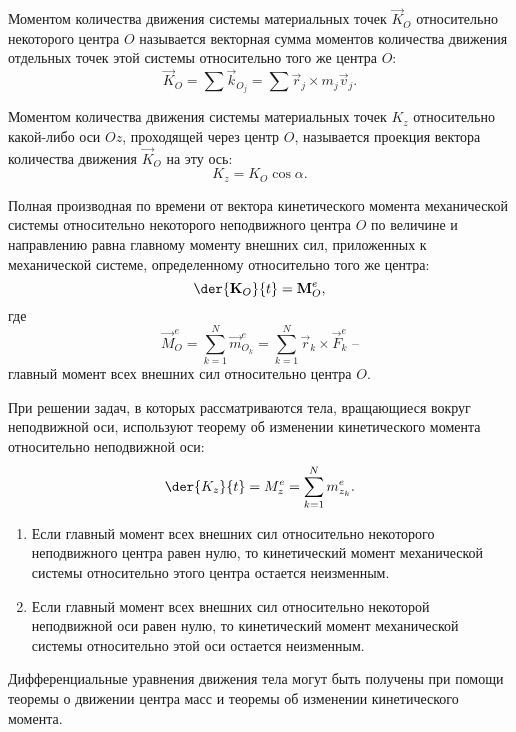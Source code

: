 
Моментом количества движения системы материальных точек \( \vec{K}_O \)
относительно некоторого центра \( O \) называется векторная сумма моментов
количества движения отдельных точек этой системы относительно того же центра
\( O \):
\[
    \vec{K}_O = \sum \vec{k}_{O_j} = \sum \vec{r}_j\times m_j\vec{v}_j.
\]
 
Моментом количества движения системы материальных точек \( K_z \) относительно
какой-либо оси \( Oz \), проходящей через центр \( O \), называется проекция
вектора количества движения \( \vec{K}_O \) на эту ось:
\[
    K_z = K_O\cos\alpha.
\]

Полная производная по времени от вектора кинетического момента механической
системы относительно некоторого неподвижного центра \( O \) по величине и
направлению равна главному моменту внешних сил, приложенных к механической
системе, определенному относительно того же центра:
\[
    \der{\vec{K}_O}{t} = \vec{M}^e_O,
\]
где
\[
    \vec{M}^e_O = \sum_{k=1}^N \vec{m}^e_{O_k} = 
    \sum_{k=1}^N \vec{r}_k\times\vec{F}^e_k \text{ --}
\]
главный момент всех внешних сил относительно центра \( O \).

При  решении  задач, в которых рассматриваются тела, вращающиеся вокруг
неподвижной оси, используют теорему об изменении кинетического момента
относительно неподвижной оси:
\[
    \der{K_z}{t} = M^e_z = \sum_{k=1}^N m^e_{z_k}.
\]
 
\begin{enumerate}
    \item Если главный момент всех внешних сил относительно некоторого
    неподвижного центра равен нулю, то кинетический момент механической системы
    относительно этого центра остается неизменным.
    \item Если главный момент всех внешних сил относительно некоторой
    неподвижной оси равен нулю, то кинетический момент механической системы
    относительно этой оси остается неизменным.
\end{enumerate}

Дифференциальные уравнения движения тела могут быть получены при помощи теоремы
о движении центра масс и теоремы об изменении кинетического момента.

